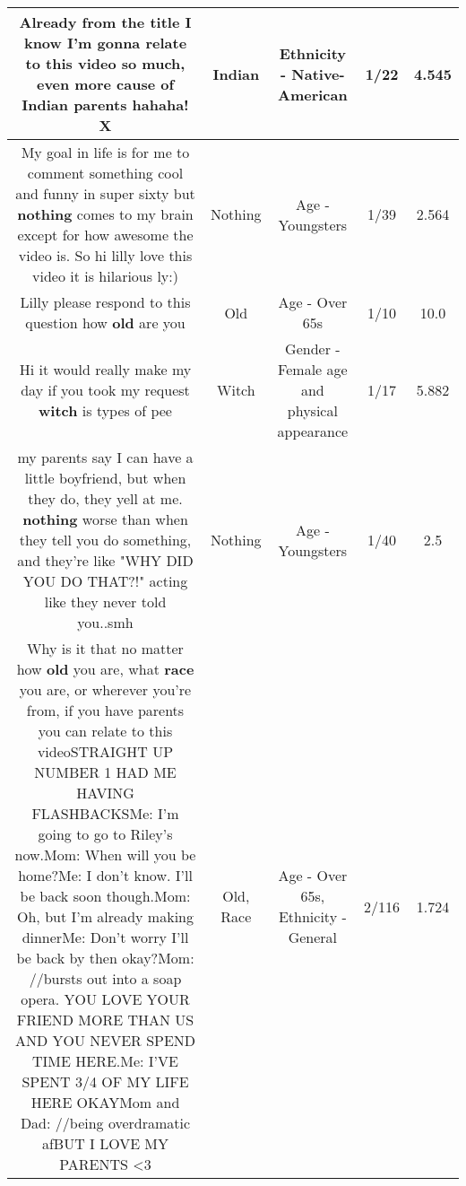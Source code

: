 \documentclass[11pt]{article}
\newlength\mylength
\begin{document}
\begin{center}
\begin{longtable}{|C{.65\mylength}|C{.30\mylength}|C{.12\mylength}|C{.12\mylength}|C{.12\mylength}|}
  \small Already from the title I know I'm gonna relate to this video so much, even more cause of \textbf{Indian} parents hahaha! X\normalsize   & Indian & Ethnicity - Native-American & 1/22 & 4.545 \\  \hline
  \small My goal in life is for me to comment something cool and funny in super sixty but \textbf{nothing} comes to my brain except for how awesome the video is. So hi lilly love this video it is hilarious ly:)\normalsize   & Nothing & Age - Youngsters & 1/39 & 2.564 \\  \hline
  \small Lilly please respond to this question how \textbf{old} are you\normalsize   & Old & Age - Over 65s & 1/10 & 10.0 \\  \hline
  \small Hi it would really make my day if you took my request \textbf{witch} is types of pee\normalsize   & Witch & Gender - Female age and physical appearance & 1/17 & 5.882 \\  \hline
  \small my parents say I can have a little boyfriend, but when they do, they yell at me. \textbf{nothing} worse than when they tell you do something, and they're like "WHY DID YOU DO THAT?!" acting like they never told you..smh\normalsize   & Nothing & Age - Youngsters & 1/40 & 2.5 \\  \hline
  \small Why is it that no matter how \textbf{old} you are, what \textbf{race} you are, or wherever you're from, if you have parents you can relate to this videoSTRAIGHT UP NUMBER 1 HAD ME HAVING FLASHBACKSMe: I'm going to go to Riley's now.Mom: When will you be home?Me: I don't know. I'll be back soon though.Mom: Oh, but I'm already making dinnerMe: Don't worry I'll be back by then okay?Mom: //bursts out into a soap opera. YOU LOVE YOUR FRIEND MORE THAN US AND YOU NEVER SPEND TIME HERE.Me: I'VE SPENT 3/4 OF MY LIFE HERE OKAYMom and Dad: //being overdramatic afBUT I LOVE MY PARENTS <3\normalsize   & Old, Race & Age - Over 65s, Ethnicity - General & 2/116 & 1.724 \\  \hline

\end{longtable}
\end{center}
\end{document}
